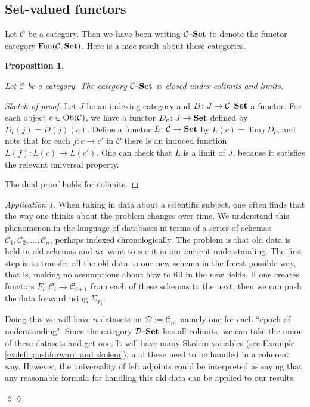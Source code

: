 \documentclass{book}
\def\tn{\textnormal}
\def\mc{\mathcal}
\def\Fun{\tn{Fun}}
\def\Ob{\tn{Ob}}
\def\to{\rightarrow}
\def\taking{\colon}
\def\Set{{\bf Set}}
\def\set{{\text \textendash}{\bf Set}}
\def\mcC{\mc{C}}
\def\mcD{\mc{D}}
\newtheorem{proposition}[subsubsection]{Proposition}
\theoremstyle{remark}
\newtheorem{app}[subsubsection]{Application}
\newenvironment{application}{\begin{app}}{\hspace*{\fill}$\lozenge\lozenge$\end{app}}
\theoremstyle{definition}
\begin{document}

\subsection{Set-valued functors}

Let $\mcC$ be a category. Then we have been writing $\mcC\set$ to denote the functor category $\Fun(\mcC,\Set)$. Here is a nice result about these categories.

\begin{proposition}\label{prop:inst closed under colim lim}

Let $\mcC$ be a category. The category $\mcC\set$ is closed under colimits and limits.

\end{proposition}

\begin{proof}[Sketch of proof]

Let $J$ be an indexing category and $D\taking J\to\mcC\set$ a functor. For each object $c\in\Ob(\mcC)$, we have a functor $D_c\taking J\to\Set$ defined by $D_c(j)=D(j)(c)$. Define a functor $L\taking\mcC\to\Set$ by $L(c)=\lim_J D_c$, and note that for each $f\taking c\to c'$ in $\mcC$ there is an induced function $L(f)\taking L(c)\to L(c')$. One can check that $L$ is a limit of $J$, because it satisfies the relevant universal property. 

The dual proof holds for colimits.

\end{proof}

\begin{application}

When taking in data about a scientific subject, one often finds that the way one thinks about the problem changes over time. We understand this phenomenon in the language of databases in terms of a \href{http://en.wikipedia.org/wiki/Schema_evolution}{\text series of schemas} $\mcC_1,\mcC_2,\ldots,\mcC_n$, perhaps indexed chronologically. The problem is that old data is held in old schemas and we want to see it in our current understanding. The first step is to transfer all the old data to our new schema in the freest possible way, that is, making no assumptions about how to fill in the new fields. If one creates functors $F_i\taking\mcC_i\to\mcC_{i+1}$ from each of these schemas to the next, then we can push the data forward using $\Sigma_{F_i}$. 

Doing this we will have $n$ datasets on $\mcD:=\mcC_n$, namely one for each ``epoch of understanding". Since the category $\mcD\set$ has all colimits, we can take the union of these datasets and get one. It will have many Skolem variables (see Example \ref{ex:left pushforward and skolem}), and these need to be handled in a coherent way. However, the universality of left adjoints could be interpreted as saying that any reasonable formula for handling this old data can be applied to our results.

\end{application}
\end{document}
